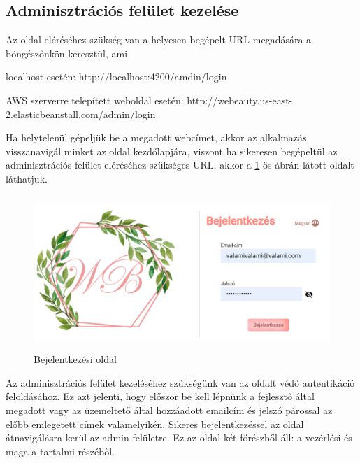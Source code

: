 \subsection{Adminisztrációs felület kezelése}
Az oldal eléréséhez szükség van a helyesen begépelt URL megadására a böngészőnkön keresztül, ami 

\begin{compactitem}
	\item localhost esetén: http://localhost:4200/amdin/login
	\item AWS szerverre telepített weboldal esetén: http://webeauty.us-east-2.elasticbeanstall.com/admin/login
\end{compactitem}

Ha helytelenül gépeljük be a megadott webcímet, akkor az alkalmazás visszanavigál minket az oldal kezdőlapjára, viszont ha sikeresen begépeltül az adminisztrációs felület eléréséhez szükséges URL, akkor a \ref{fig.exemple-5}-ös ábrán látott oldalt láthatjuk.
	\begin{figure}[H]
	\centering
	\includegraphics[width=1.0\textwidth,height=220px]{images/bejelentkezes.png}
	\caption{Bejelentkezési oldal}
	\label{fig.exemple-5}
\end{figure}
Az adminisztrációs felület kezeléséhez szükségünk van az oldalt védő autentikáció feloldásához. Ez azt jelenti, hogy először be kell lépnünk a fejlesztő által megadott vagy az üzemeltető által hozzáadott emailcím és jelszó párossal az előbb emlegetett címek valamelyikén. Sikeres bejelentkezéssel az oldal átnavigálásra kerül az admin felületre. Ez az oldal két főrészből áll: a vezérlési és maga a tartalmi részéből.
